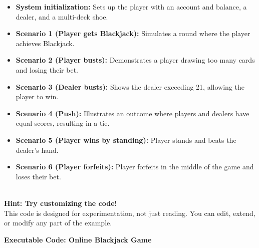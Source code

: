 \begin{itemize}
\item
\protect{}\label{zCD3mlqWNlzHlaeAy_pTn}
\textbf{System initialization:} Sets up the player with an account and balance, a dealer, and a multi-deck shoe.
\item
\protect{}\label{od_adrgTSjOstOGKT71p2}
\textbf{Scenario 1 (Player gets Blackjack):} Simulates a round where the player achieves Blackjack.
\item
\protect{}\label{OdXl-SmK1H2dfvI64uO8y}
\textbf{Scenario 2 (Player busts):} Demonstrates a player drawing too many cards and losing their bet.
\item
\protect{}\label{SSjZvsGZUYPlnAW8_xe-v}
\textbf{Scenario 3 (Dealer busts):} Shows the dealer exceeding 21, allowing the player to win.
\item
\protect{}\label{WqRM61yLlHltu5Io9Wcrg}
\textbf{Scenario 4 (Push):} Illustrates an outcome where players and dealers have equal scores, resulting in a tie.
\item
\protect{}\label{PFIcpEIBQ1FN--7Gkha5O}
\textbf{Scenario 5 (Player wins by standing):} Player stands and beats the dealer's hand.
\item
\protect{}\label{_E5_4VnOlLtDwdncj9lh_}
\textbf{Scenario 6 (Player forfeits):} Player forfeits in the middle of the game and loses their bet.
\end{itemize}
\\
\textbf{Hint: Try customizing the code!}
\\
This code is designed for experimentation, not just reading. You can edit, extend, or modify any part of the example.

\textbf{Executable Code: Online Blackjack Game}

